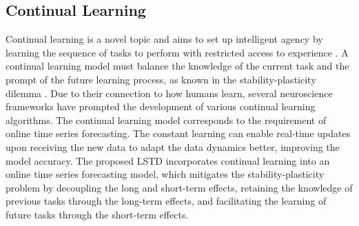 \subsection{Continual Learning}
Continual learning is a novel topic and aims to set up intelligent agency by learning the sequence of tasks to perform with restricted access to experience \cite{lopez2017gradient}. A continual learning model must balance the knowledge of the current task and the prompt of the future learning process, as known in the stability-plasticity dilemma \cite{lin1992self,grossberg2013adaptive}. Due to their connection to how humans learn, several neuroscience frameworks have prompted the development of various continual learning algorithms. The continual learning model corresponds to the requirement of online time series forecasting. The constant learning can enable real-time updates upon receiving the new data to adapt the data dynamics better, improving the model accuracy.
The proposed LSTD incorporates continual learning into an online time series forecasting model, which mitigates the stability-plasticity problem by decoupling the long and short-term effects, retaining the knowledge of previous tasks through the long-term effects, and facilitating the learning of future tasks through the short-term effects.
